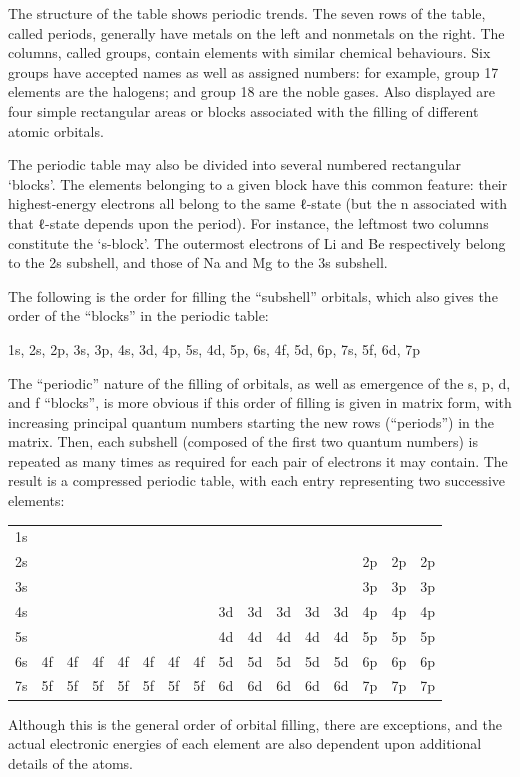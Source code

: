 \documentclass[
]{book}
\begin{document}
The structure of the table shows periodic trends. The seven rows of the table, called periods, generally have metals on the left and nonmetals on the right. The columns, called groups, contain elements with similar chemical behaviours. Six groups have accepted names as well as assigned numbers: for example, group 17 elements are the halogens; and group 18 are the noble gases. Also displayed are four simple rectangular areas or blocks associated with the filling of different atomic orbitals.

The periodic table may also be divided into several numbered rectangular `blocks'. The elements belonging to a given block have this common feature: their highest-energy electrons all belong to the same ℓ-state (but the n associated with that ℓ-state depends upon the period). For instance, the leftmost two columns constitute the `s-block'. The outermost electrons of Li and Be respectively belong to the 2s subshell, and those of Na and Mg to the 3s subshell.

The following is the order for filling the ``subshell'' orbitals, which also gives the order of the ``blocks'' in the periodic table:

1s, 2s, 2p, 3s, 3p, 4s, 3d, 4p, 5s, 4d, 5p, 6s, 4f, 5d, 6p, 7s, 5f, 6d, 7p

The ``periodic'' nature of the filling of orbitals, as well as emergence of the s, p, d, and f ``blocks'', is more obvious if this order of filling is given in matrix form, with increasing principal quantum numbers starting the new rows (``periods'') in the matrix. Then, each subshell (composed of the first two quantum numbers) is repeated as many times as required for each pair of electrons it may contain. The result is a compressed periodic table, with each entry representing two successive elements:

\begin{longtable}[]{@{}llllllllllllllll@{}}
\toprule
\endhead
1s & & & & & & & & & & & & & & &\tabularnewline
2s & & & & & & & & & & & & & 2p & 2p & 2p\tabularnewline
3s & & & & & & & & & & & & & 3p & 3p & 3p\tabularnewline
4s & & & & & & & & 3d & 3d & 3d & 3d & 3d & 4p & 4p & 4p\tabularnewline
5s & & & & & & & & 4d & 4d & 4d & 4d & 4d & 5p & 5p & 5p\tabularnewline
6s & 4f & 4f & 4f & 4f & 4f & 4f & 4f & 5d & 5d & 5d & 5d & 5d & 6p & 6p & 6p\tabularnewline
7s & 5f & 5f & 5f & 5f & 5f & 5f & 5f & 6d & 6d & 6d & 6d & 6d & 7p & 7p & 7p\tabularnewline
\bottomrule
\end{longtable}

Although this is the general order of orbital filling, there are exceptions, and the actual electronic energies of each element are also dependent upon additional details of the atoms.
\end{document}
